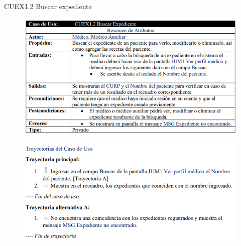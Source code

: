 \documentclass[12pt,letterpaper]{article}
\begin{document}
            \newpage
            CUEX1.2 Buscar expediente 
            \begin{figure}[H]
                \centering
                \includegraphics [scale=0.8]{specs/specBuscarExpediente}
            \end{figure}
            \begin{figure}[H]
                \centering
                \includegraphics [scale=0.9]{specs/trayBuscarExpediente}
            \end{figure}
\end{document}
